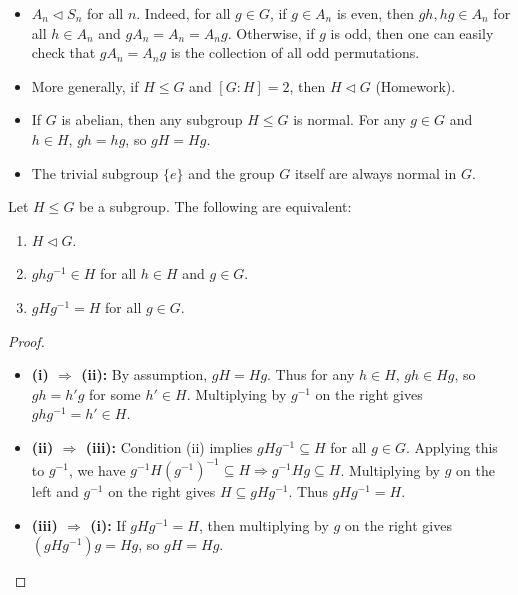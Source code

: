 \begin{example}
\begin{itemize}
    \item $A_n \triangleleft S_n$ for all $n$. Indeed, for all $g \in G$, if $g \in A_n$ is even, then $gh, hg \in A_n$ for all $h \in A_n$ and $gA_n = A_n = A_ng$. Otherwise, if
    $g$ is odd, then one can easily check that $gA_n = A_ng$ is the collection of all odd permutations.
    \item More generally, if $H \le G$ and $[G:H] = 2$, then $H \triangleleft G$ (Homework).
    \item If $G$ is abelian, then any subgroup $H \le G$ is normal. For any $g \in G$ and $h \in H$, $gh = hg$, so $gH = Hg$.
    \item The trivial subgroup $\{e\}$ and the group $G$ itself are always normal in $G$.
\end{itemize}
\end{example}

\begin{theorem}
Let $H \le G$ be a subgroup. The following are equivalent:
\begin{enumerate}
    \item[(i)] $H \triangleleft G$.
    \item[(ii)] $g h g^{-1} \in H$ for all $h \in H$ and $g \in G$.
    \item[(iii)] $g H g^{-1} = H$ for all $g \in G$.
\end{enumerate}
\end{theorem}

\begin{proof}
\begin{itemize}
    \item \textbf{(i) $\Rightarrow$ (ii):} By assumption, $gH = Hg$. Thus for any $h \in H$, $gh \in Hg$, so $gh = h'g$ for some $h' \in H$. Multiplying by $g^{-1}$ on the right gives $ghg^{-1} = h' \in H$.
    \item \textbf{(ii) $\Rightarrow$ (iii):} Condition (ii) implies $gHg^{-1} \subseteq H$ for all $g \in G$. Applying this to $g^{-1}$, we have $g^{-1}H(g^{-1})^{-1} \subseteq H \Rightarrow g^{-1}Hg \subseteq H$. Multiplying by $g$ on the left and $g^{-1}$ on the right gives $H \subseteq gHg^{-1}$. Thus $gHg^{-1} = H$.
    \item \textbf{(iii) $\Rightarrow$ (i):} If $gHg^{-1} = H$, then multiplying by $g$ on the right gives $(gHg^{-1})g = Hg$, so $gH = Hg$.
\end{itemize}
\end{proof}

